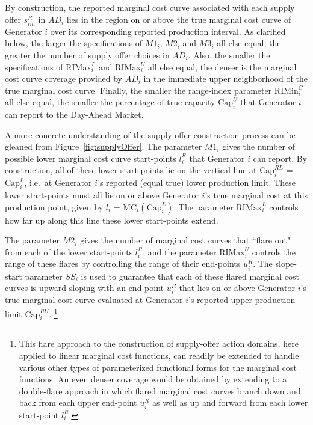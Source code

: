 \documentclass[12pt]{article}
\begin{document}
By construction, the reported marginal cost curve associated with each supply offer $s^R_{im}$ in $AD_i$ lies in the region on or above the true marginal cost curve of Generator $i$ over its corresponding reported production interval. As clarified below, the larger the specifications of $M1_i$, $M2_i$ and $M3_i$ all else equal, the greater the number of supply offer choices in $AD_i$.  Also, the smaller the specifications of $\mbox{RIMax}^L_i$ and $\mbox{RIMax}^U_i$ all else equal, the denser is the marginal cost curve coverage provided by $AD_i$ in the immediate upper neighborhood of the true marginal cost curve. Finally, the smaller the range-index parameter $\mbox{RIMin}^C_i$ all else equal, the smaller the percentage of true capacity $\mbox{Cap}^U_i$ that Generator $i$ can report to the Day-Ahead Market. 
     
A more concrete understanding of the supply offer construction process can be gleaned from Figure~\ref{fig:supplyOffer}. The parameter $M1_i$ gives the number of possible lower marginal cost curve start-points $l^R_{i}$ that Generator $i$ can report.  By construction, all of these lower start-points lie on the vertical line at $\mbox{Cap}^{RL}_{i}$ = $\mbox{Cap}^L_{i}$, i.e.\ at Generator $i$'s reported (equal true) lower production limit.  These lower start-points must all lie on or above Generator $i$'s true marginal cost at this production point, given by $l_i$ = $\mbox{MC}_i(\mbox{Cap}^L_i)$.  The parameter $\mbox{RIMax}^L_i$ controls how far up along this line these lower start-points extend.  

The parameter $M2_i$ gives the number of marginal cost curves that ``flare out" from each of the 
lower start-points $l^R_{i}$, and the parameter $\mbox{RIMax}^U_i$ controls the range of these flares by controlling the range of their end-points $u^R_i$. 
The slope-start parameter $SS_i$ is used to guarantee that each of these flared marginal cost curves is upward sloping with an end-point $u^R_i$ that lies on or above Generator $i$'s true marginal cost curve evaluated at Generator $i$'s reported upper production limit $\mbox{Cap}^{RU}_i$.%
       \footnote{This flare approach to the construction of supply-offer action domains, here applied to linear marginal cost functions, can readily be extended to handle various other types of parameterized functional forms for the marginal cost functions.  An even denser coverage would be obtained by extending to a double-flare approach in which flared marginal cost curves branch down and back from each upper end-point $u^R_i$ as well as up and forward from 
each lower start-point $l^R_i$.}   
  
\end{document}
